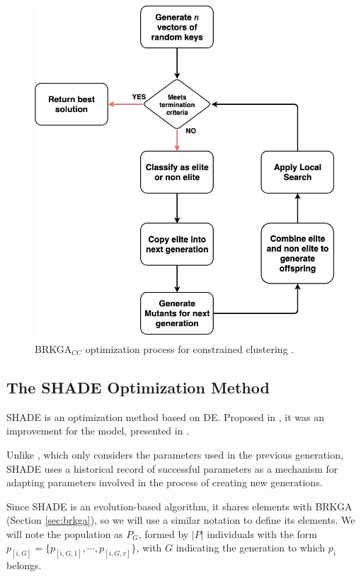\begin{figure}[!h]
	\centering
	\includegraphics[scale=0.31]{gfx/NewProp/SHADE/BRKGA_Diagram.jpg} 
	\caption[\acs{BRKGA}$_{CC}$ optimization process for constrained clustering.]{\acs{BRKGA}$_{CC}$ optimization process for constrained clustering \cite{de2017comparison}.}\label{fig:BRKGA_CC}
\end{figure}

\subsection[The \acsfont{SHADE} Optimization Method]{The SHADE Optimization Method} \label{sec:SHADE}

\acf{SHADE} is an optimization method based on \acs{DE}. Proposed in \cite{tanabe2013success}, it was an improvement for the  model, presented in \cite{zhang2009jade}.

Unlike , which only considers the parameters used in the previous generation, \acs{SHADE} uses a historical record of successful parameters as a mechanism for adapting parameters involved in the process of creating new generations.

Since \acs{SHADE} is an evolution-based algorithm, it shares elements with \acs{BRKGA} (Section \ref{sec:brkga}), so we will use a similar notation to define its elements. We will note the population as $P_G$, formed by $|P|$ individuals with the form $p_{[i,G]} = \{p_{[i,G,1]}, \cdots, p_{[i,G,v]}\}$, with $G$ indicating the generation to which $p_i$ belongs.

